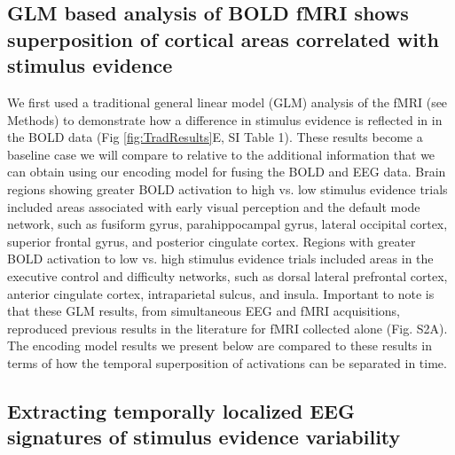 \subsection*{GLM based analysis of BOLD fMRI shows superposition of cortical areas correlated with stimulus evidence}

We first used a traditional general linear model (GLM) analysis of the fMRI (see Methods) to demonstrate how a difference in stimulus evidence is reflected in in the BOLD data (Fig \ref{fig:TradResults}E, SI Table 1). These results become a baseline case we will compare to relative to the additional information that we can obtain using our encoding model for fusing the BOLD and EEG data. Brain regions showing greater BOLD activation to high vs. low stimulus evidence trials included areas associated with early visual perception and the default mode network, such as fusiform gyrus, parahippocampal gyrus, lateral occipital cortex, superior frontal gyrus, and posterior cingulate cortex. Regions with greater BOLD activation to low vs. high stimulus evidence trials included areas in the executive control and difficulty networks, such as dorsal lateral prefrontal cortex, anterior cingulate cortex, intraparietal sulcus, and insula. Important to note is that these GLM results, from simultaneous EEG and fMRI acquisitions, reproduced previous results in the literature for fMRI collected alone \cite{Heekeren2004}(Fig. S2A).  The encoding model results we present below are compared to these results in terms of how the temporal superposition of activations can be separated in time. 

\subsection*{Extracting temporally localized EEG signatures of stimulus evidence variability}

